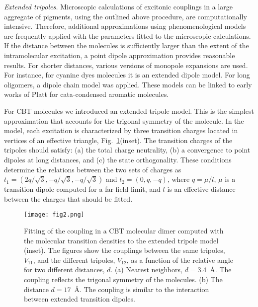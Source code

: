 \documentclass[journal=jacs,manuscript=article]{achemso}
\begin{document}
\textit{Extended tripoles.} Microscopic calculations of excitonic couplings in a large aggregate of pigments, using the outlined above procedure, are computationally intensive. Therefore, additional approximations using phenomenological models are frequently applied with the parameters fitted to the microscopic calculations.  If the distance between the molecules is sufficiently larger than the extent of the intramolecular excitation, a point dipole approximation provides reasonable results. For shorter distances, various versions of monopole expansions are used. For instance, for cyanine dyes molecules it is an extended dipole model.\cite{Ko96__} For long oligomers, a dipole chain model was applied.\cite{Manas1998} These models can be linked to early works of Platt for cata-condensed aromatic molecules.\cite{Platt1949}

For CBT molecules we introduced an extended tripole model. This is the simplest approximation that accounts for the trigonal symmetry of the molecule. In the model, each excitation is characterized by three transition charges located in vertices of an effective triangle, Fig.~\ref{fig:inter_dimer}(inset). The transition charges of the tripoles should satisfy: (a) the total charge neutrality, (b) a convergence to point dipoles at long distances, and (c) the state orthogonality. These conditions determine the relations between the two sets of charges as $t_1=(2q/\sqrt{3},-q/\sqrt{3},-q/\sqrt{3})$  and $t_2=(0,q,-q)$, where $q=\mu/l$, $\mu$  is a transition dipole computed for a far-field limit, and $l$ is an effective distance between the charges that should be fitted.

\begin{figure}
\begin{center}
\texttt{[image: fig2.png]}
\caption{Fitting of the coupling in a CBT molecular dimer computed with the molecular transition densities to the extended tripole model (inset). The figures show the couplings between the same tripoles, $V_{11}$, and the different tripoles, $V_{12}$, as a function of the relative angle for two different distances, $d$. (a) Nearest neighbors, $d=3.4$~\AA. The coupling reflects the trigonal symmetry of the molecules. (b) The distance $d=17$~\AA. The coupling is similar to the interaction between extended transition dipoles.}
\label{fig:inter_dimer}
\end{center}
\end{figure}
\end{document}
